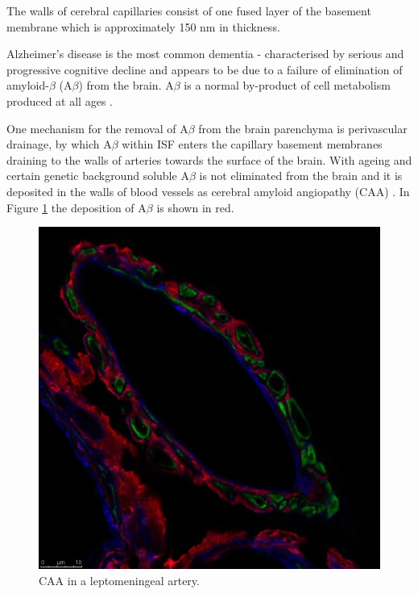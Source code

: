 \documentclass[12pt]{article} %
\theoremstyle{definition}
\begin{document}
The walls of cerebral capillaries consist of one fused layer of  the basement membrane which is approximately 150 nm in thickness.  

Alzheimer's disease is the most common dementia - characterised by serious and progressive cognitive decline and appears to be due to a failure of elimination of amyloid-$\beta$ (A$\beta$) from the brain.  A$\beta$ is a normal by-product of cell metabolism produced at all ages \cite{wellerperi}.

One mechanism for the removal of A$\beta$ from the brain parenchyma is perivascular drainage, by which A$\beta$ within ISF enters the capillary basement membranes draining to the walls of arteries towards the surface of the brain.  With ageing and certain genetic background soluble A$\beta$ is not eliminated from the brain and it is deposited in the walls of blood vessels as cerebral amyloid angiopathy (CAA) \cite{Rox}\cite{wellerperi}.  In Figure \ref{figy:2}  the deposition of A$\beta$ is shown in red.  

\begin{figure}

              \centering
               \includegraphics[scale=0.15]{abeta.jpg}
                \caption{CAA in a leptomeningeal artery.}\label{figy:2}
\end{figure}
\end{document}
